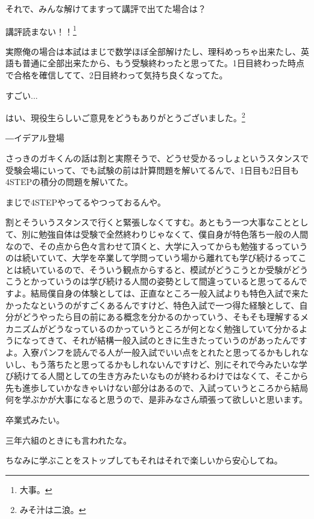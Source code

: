 \begin{multicols}{2}
それで、みんな解けてますって講評で出てた場合は？

講評読まない！！\footnote{ 大事。}

実際俺の場合は本試はまじで数学ほぼ全部解けたし、理科めっちゃ出来たし、英語も普通に全部出来たから、もう受験終わったと思ってた。1日目終わった時点で合格を確信してて、2日目終わって気持ち良くなってた。

すごい...

はい、現役生らしいご意見をどうもありがとうございました。\footnote{みそ汁は二浪。}

\par\hspace{5mm}―イデアル登場

さっきのガキくんの話は割と実際そうで、どうせ受かるっしょというスタンスで受験会場にいって、でも試験の前は計算問題を解いてるんで、1日目も2日目も4STEPの積分の問題を解いてた。

まじで4STEPやってるやつっておるんや。

割とそういうスタンスで行くと緊張しなくてすむ。あともう一つ大事なこととして、別に勉強自体は受験で全然終わりじゃなくて、僕自身が特色落ち一般の人間なので、その点から色々言わせて頂くと、大学に入ってからも勉強するっていうのは続いていて、大学を卒業して学問っていう場から離れても学び続けるってことは続いているので、そういう観点からすると、模試がどうこうとか受験がどうこうとかっていうのは学び続ける人間の姿勢として間違っていると思ってるんですよ。結局僕自身の体験としては、正直なところ一般入試よりも特色入試で来たかったなというのがすごくあるんですけど、特色入試で一つ得た経験として、自分がどうやったら目の前にある概念を分かるのかっていう、そもそも理解するメカニズムがどうなっているのかっていうところが何となく勉強していて分かるようになってきて、それが結構一般入試のときに生きたっていうのがあったんですよ。入寮パンフを読んでる人が一般入試でいい点をとれたと思ってるかもしれないし、もう落ちたと思ってるかもしれないんですけど、別にそれで今みたいな学び続けてる人間としての生き方みたいなものが終わるわけではなくて、そこから先も進歩していかなきゃいけない部分はあるので、入試っていうところから結局何を学ぶかが大事になると思うので、是非みなさん頑張って欲しいと思います。

卒業式みたい。

三年六組のときにも言われたな。

ちなみに学ぶことをストップしてもそれはそれで楽しいから安心してね。


\end{multicols}
